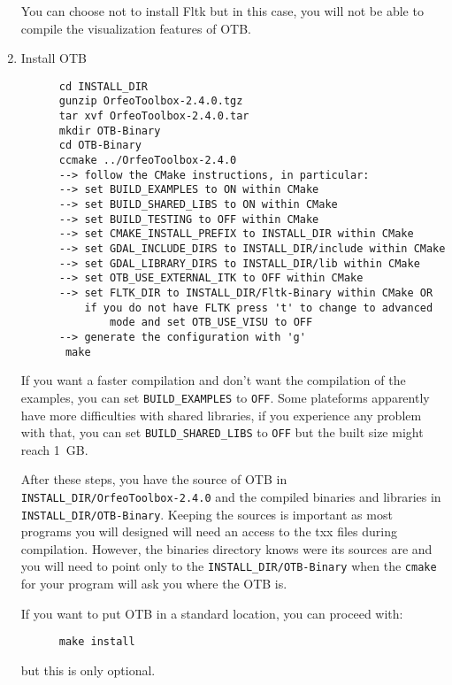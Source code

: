 \begin{enumerate}
   You can choose not to install Fltk but in this case, you will not be able to
   compile the visualization features of OTB.

\item Install OTB
  \begin{verbatim}
      cd INSTALL_DIR
      gunzip OrfeoToolbox-2.4.0.tgz
      tar xvf OrfeoToolbox-2.4.0.tar
      mkdir OTB-Binary
      cd OTB-Binary
      ccmake ../OrfeoToolbox-2.4.0
      --> follow the CMake instructions, in particular:
	  --> set BUILD_EXAMPLES to ON within CMake
	  --> set BUILD_SHARED_LIBS to ON within CMake
	  --> set BUILD_TESTING to OFF within CMake
	  --> set CMAKE_INSTALL_PREFIX to INSTALL_DIR within CMake
	  --> set GDAL_INCLUDE_DIRS to INSTALL_DIR/include within CMake
	  --> set GDAL_LIBRARY_DIRS to INSTALL_DIR/lib within CMake
	  --> set OTB_USE_EXTERNAL_ITK to OFF within CMake
	  --> set FLTK_DIR to INSTALL_DIR/Fltk-Binary within CMake OR
	      if you do not have FLTK press 't' to change to advanced
              mode and set OTB_USE_VISU to OFF 
	  --> generate the configuration with 'g'
       make
  \end{verbatim}
  
  If you want a faster compilation and don't want the compilation of the examples, you
  can set \texttt{BUILD\_EXAMPLES} to \texttt{OFF}. Some plateforms apparently 
  have more difficulties with shared libraries, if you experience any problem 
  with that, you can set \texttt{BUILD\_SHARED\_LIBS} to \texttt{OFF} but the 
  built size might reach 1~GB.
      
  After these steps, you have the source of OTB in \texttt{INSTALL\_DIR/OrfeoToolbox-2.4.0}
  and the compiled binaries and libraries in \texttt{INSTALL\_DIR/OTB-Binary}. Keeping
  the sources is important as most programs you will designed will need an access 
  to the txx files during compilation. However, the binaries directory knows were
  its sources are and you will need to point only to the \texttt{INSTALL\_DIR/OTB-Binary}
  when the \texttt{cmake} for your program will ask you where the OTB is. 

  If you want to put OTB in a standard location, you can proceed with:
      
  \begin{verbatim}
      make install
  \end{verbatim}
  
  but this is only optional.
  
    
\end{enumerate}

